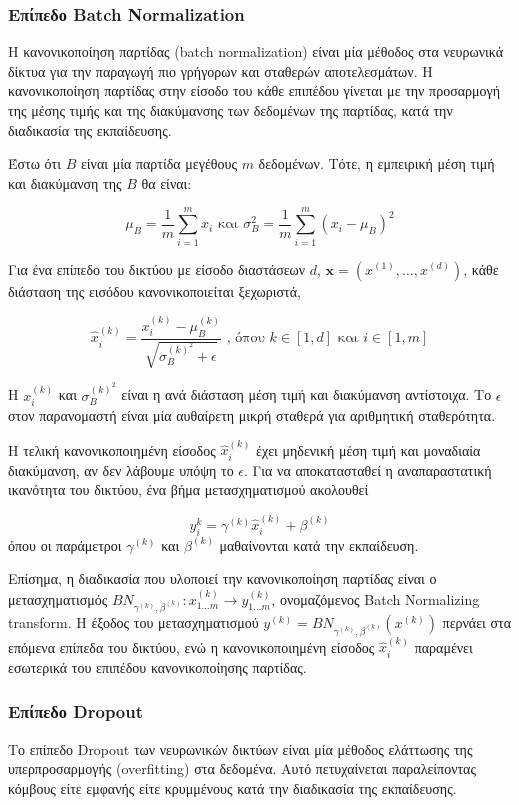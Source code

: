 \subsubsection{Επίπεδο Batch Normalization}
\label{definition:batch_normalization}
	Η κανονικοποίηση παρτίδας (batch normalization) είναι μία μέθοδος στα νευρωνικά δίκτυα για την παραγωγή πιο γρήγορων και σταθερών αποτελεσμάτων. Η κανονικοποίηση παρτίδας στην είσοδο του κάθε επιπέδου γίνεται με την προσαρμογή της μέσης τιμής και της διακύμανσης των δεδομένων της παρτίδας, κατά την διαδικασία της εκπαίδευσης.
	
	Έστω ότι $B$ είναι μία παρτίδα μεγέθους $m$ δεδομένων. Τότε, η εμπειρική μέση τιμή και διακύμανση της $B$ θα είναι:
	
	\[ \mu_B = \dfrac{1}{m} \sum_{i=1}^{m} x_i \text{ και } \sigma_B^2 = \dfrac{1}{m} \sum_{i=1}^m(x_i - \mu_B)^2  \]
	
	Για ένα επίπεδο του δικτύου με είσοδο διαστάσεων $d$, $\pmb{x} = (x^{(1)}, \dots, x^{(d)})$, κάθε διάσταση της εισόδου κανονικοποιείται ξεχωριστά,
	
	\[ \hat{x}_i^{(k)} = \dfrac{x_i^{(k)} - \mu_B^{(k)}}{\sqrt{\sigma_B^{(k)^{2}} + \epsilon}} \text{ , όπου } k \in [1,d] \text{ και } i \in [1,m] \]
	
	Η $x_i^{(k)}$ και $\sigma_B^{(k)^{2}}$ είναι η ανά διάσταση μέση τιμή και διακύμανση αντίστοιχα. Το $\epsilon$ στον παρανομαστή είναι μία αυθαίρετη μικρή σταθερά για αριθμητική σταθερότητα.
	
	Η τελική κανονικοποιημένη είσοδος $\hat{x}_i^{(k)}$ έχει μηδενική μέση τιμή και μοναδιαία διακύμανση, αν δεν λάβουμε υπόψη το $\epsilon$. Για να αποκατασταθεί η αναπαραστατική ικανότητα του δικτύου, ένα βήμα μετασχηματισμού ακολουθεί
	
	\[ y_i^{k} = \gamma^{(k)}\hat{x}_i^{(k)} + \beta^{(k)} \]
	όπου οι παράμετροι $\gamma^{(k)}$ και $\beta^{(k)}$ μαθαίνονται κατά την εκπαίδευση.
	
	Επίσημα, η διαδικασία που υλοποιεί την κανονικοποίηση παρτίδας είναι ο μετασχηματισμός $BN_{\gamma^{(k)},\beta^{(k)}}: x_{1 \dots m}^{(k)} \rightarrow y_{1 \dots m}^{(k)}$, ονομαζόμενος Batch Normalizing transform. Η έξοδος του μετασχηματισμού $y^{(k)} = BN_{\gamma^{(k)},\beta^{(k)}}(x^{(k)})$ περνάει στα επόμενα επίπεδα του δικτύου, ενώ η κανονικοποιημένη είσοδος $\hat{x}_i^{(k)}$ παραμένει εσωτερικά του επιπέδου κανονικοποίησης παρτίδας.
		


\subsubsection{Επίπεδο Dropout}
\label{definition:dropout}
	Το επίπεδο Dropout των νευρωνικών δικτύων είναι μία μέθοδος ελάττωσης της υπερπροσαρμογής (overfitting) στα δεδομένα. Αυτό πετυχαίνεται παραλείποντας κόμβους είτε εμφανής είτε κρυμμένους κατά την διαδικασία της εκπαίδευσης.
	
